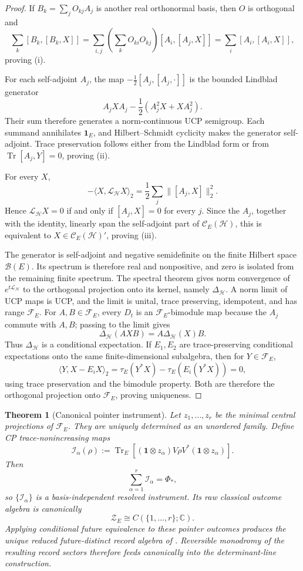\documentclass[11pt]{article}
\newtheorem{theorem}{Theorem}[section]
\theoremstyle{definition}
\theoremstyle{remark}
\newcommand{\C}{\mathbb C}
\newcommand{\one}{\mathbf 1}
\newcommand{\Tr}{\operatorname{Tr}}
\newcommand{\norm}[1]{\lVert#1\rVert}
\begin{document}
\begin{proof}
If \(B_k=\sum_jO_{kj}A_j\) is another real orthonormal basis, then \(O\) is
orthogonal and
\[
 \sum_k[B_k,[B_k,X]]
 =
 \sum_{i,j}\left(\sum_kO_{ki}O_{kj}\right)[A_i,[A_j,X]]
 =
 \sum_i[A_i,[A_i,X]],
\]
proving (i).

For each self-adjoint \(A_j\), the map
\(-\tfrac12[A_j,[A_j,\cdot]]\) is the bounded Lindblad generator
\[
 A_jXA_j-\frac12(A_j^2X+XA_j^2).
\]
Their sum therefore generates a norm-continuous UCP semigroup.  Each summand
annihilates \(\one_E\), and Hilbert--Schmidt cyclicity makes the generator
self-adjoint.  Trace preservation follows either from the Lindblad form or
from \(\Tr[A_j,Y]=0\), proving (ii).

For every \(X\),
\[
 -\langle X,\mathcal L_{\mathscr H}X\rangle_2
 =
 \frac12\sum_j\norm{[A_j,X]}_2^2.
\]
Hence \(\mathcal L_{\mathscr H}X=0\) if and only if
\([A_j,X]=0\) for every \(j\).  Since the \(A_j\), together with the identity,
linearly span the self-adjoint part of \(\mathcal C_E(\mathscr H)\), this is
equivalent to \(X\in\mathcal C_E(\mathscr H)'\), proving (iii).

The generator is self-adjoint and negative semidefinite on the finite
Hilbert space \(\mathcal B(E)\).  Its spectrum is therefore real and
nonpositive, and zero is isolated from the remaining finite spectrum.  The
spectral theorem gives norm convergence of \(e^{t\mathcal L_{\mathscr H}}\)
to the orthogonal projection onto its kernel, namely
\(\Delta_{\mathscr H}\).  A norm limit of UCP maps is UCP, and the limit is
unital, trace preserving, idempotent, and has range \(\mathcal F_E\).
For \(A,B\in\mathcal F_E\), every \(D_t\) is an
\(\mathcal F_E\)-bimodule map because the \(A_j\) commute with \(A,B\);
passing to the limit gives
\[
 \Delta_{\mathscr H}(AXB)=A\Delta_{\mathscr H}(X)B.
\]
Thus \(\Delta_{\mathscr H}\) is a conditional expectation.  If
\(E_1,E_2\) are trace-preserving conditional expectations onto the same
finite-dimensional subalgebra, then for \(Y\in\mathcal F_E\),
\[
 \langle Y,X-E_iX\rangle_2
 =\tau_E(Y^*X)-\tau_E(E_i(Y^*X))
 =0,
\]
using trace preservation and the bimodule property.  Both are therefore the
orthogonal projection onto \(\mathcal F_E\), proving uniqueness.
\end{proof}

\begin{theorem}[Canonical pointer instrument]
\label{thm:canonical-pointer-instrument}
Let \(z_1,\ldots,z_r\) be the minimal central projections of
\(\mathcal F_E\).  They are uniquely determined as an unordered family.
Define CP trace-nonincreasing maps
\[
 \mathcal I_\alpha(\rho)
 :=
 \Tr_E\!\left[
 (\one\otimes z_\alpha)V\rho V^*(\one\otimes z_\alpha)
 \right].
\]
Then
\[
 \sum_{\alpha=1}^r\mathcal I_\alpha=\Phi_*,
\]
so \(\{\mathcal I_\alpha\}\) is a basis-independent resolved instrument.
Its raw classical outcome algebra is canonically
\[
 \mathcal Z_E\cong C(\{1,\ldots,r\};\C).
\]
Applying conditional future equivalence to these pointer outcomes produces
the unique reduced future-distinct record algebra of
.  Reversible monodromy of the resulting
record sectors therefore feeds canonically into the determinant-line
construction.
\end{theorem}
\end{document}
